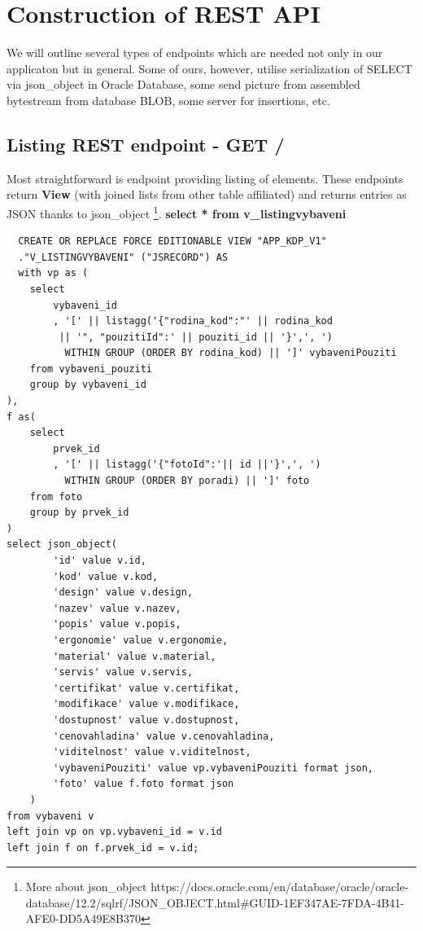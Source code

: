 \documentclass{article}
\begin{document}
\section{Construction of REST API}
We will outline several types of endpoints which are needed not only in our applicaton but in general. Some of ours, however, utilise serialization of SELECT via json\_object in Oracle Database, some send picture from assembled bytestream from database BLOB, some server for insertions, etc.
\subsection{Listing REST endpoint - GET / }
Most straightforward is endpoint providing listing of elements. These endpoints return \textbf{View} (with joined lists from other table affiliated) and returns entries as JSON thanks to json\_object \footnote{More about json\_object https://docs.oracle.com/en/database/oracle/oracle-database/12.2/sqlrf/JSON\_OBJECT.html\#GUID-1EF347AE-7FDA-4B41-AFE0-DD5A49E8B370}. \textbf{select * from v\_listingvybaveni}
\begin{lstlisting}
  CREATE OR REPLACE FORCE EDITIONABLE VIEW "APP_KDP_V1"
  ."V_LISTINGVYBAVENI" ("JSRECORD") AS
  with vp as (
    select
        vybaveni_id
        , '[' || listagg('{"rodina_kod":"' || rodina_kod
         || '", "pouzitiId":' || pouziti_id || '}',', ')
          WITHIN GROUP (ORDER BY rodina_kod) || ']' vybaveniPouziti
    from vybaveni_pouziti
    group by vybaveni_id
),
f as(
    select
        prvek_id
        , '[' || listagg('{"fotoId":'|| id ||'}',', ')
          WITHIN GROUP (ORDER BY poradi) || ']' foto
    from foto
    group by prvek_id  
)
select json_object(
        'id' value v.id,
        'kod' value v.kod,
        'design' value v.design,
        'nazev' value v.nazev,
        'popis' value v.popis,
        'ergonomie' value v.ergonomie,
        'material' value v.material,
        'servis' value v.servis,
        'certifikat' value v.certifikat,
        'modifikace' value v.modifikace,
        'dostupnost' value v.dostupnost,
        'cenovahladina' value v.cenovahladina,
        'viditelnost' value v.viditelnost,
        'vybaveniPouziti' value vp.vybaveniPouziti format json,
        'foto' value f.foto format json
    )
from vybaveni v
left join vp on vp.vybaveni_id = v.id
left join f on f.prvek_id = v.id;
\end{lstlisting}
\end{document}
